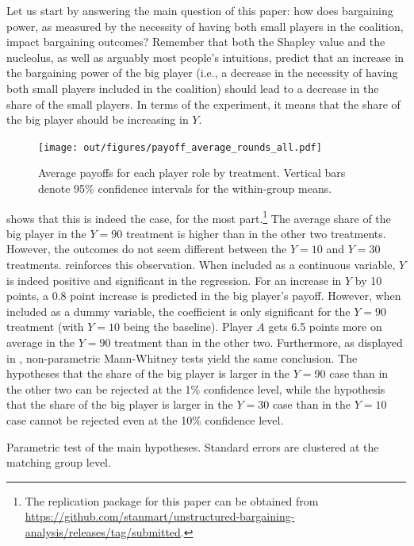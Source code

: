 \documentclass[12pt]{article}
\begin{document}
Let us start by answering the main question of this paper: how does bargaining power, as measured by the necessity of having both small players in the coalition, impact bargaining outcomes? Remember that both the Shapley value and the nucleolus, as well as arguably most people's intuitions, predict that an increase in the bargaining power of the big player (i.e., a decrease in the necessity of having both small players included in the coalition) should lead to a decrease in the share of the small players. In terms of the experiment, it means that the share of the big player should be increasing in $Y$.

\begin{figure}
    \centering
    \texttt{[image: out/figures/payoff\_average\_rounds\_all.pdf]}
    \caption{Average payoffs for each player role by treatment. Vertical bars denote 95\% confidence intervals for the within-group means.}
    \label{fig:main_means}
\end{figure}

 shows that this is indeed the case, for the most part.\footnote{The replication package for this paper can be obtained from  \\\href{https://github.com/stanmart/unstructured-bargaining-analysis/releases/tag/submitted}{https://github.com/stanmart/unstructured-bargaining-analysis/releases/tag/submitted}.} The average share of the big player in the $Y=90$ treatment is higher than in the other two treatments. However, the outcomes do not seem different between the $Y=10$ and $Y=30$ treatments.  reinforces this observation. When included as a continuous variable, $Y$ is indeed positive and significant in the regression. For an increase in $Y$ by 10 points, a 0.8 point increase is predicted in the big player's payoff. However, when included as a dummy variable, the coefficient is only significant for the $Y=90$ treatment (with $Y=10$ being the baseline). Player $A$ gets 6.5 points more on average in the $Y=90$ treatment than in the other two. Furthermore, as displayed in , non-parametric Mann-Whitney tests yield the same conclusion. The hypotheses that the share of the big player is larger in the $Y=90$ case than in the other two can be rejected at the 1\% confidence level, while the hypothesis that the share of the big player is larger in the $Y=30$ case than in the $Y=10$ case cannot be rejected even at the 10\% confidence level.

\begin{table}
    \centering
    
    \caption{Parametric test of the main hypotheses. Standard errors are clustered at the matching group level.}
    \label{tab:main_regressions}
\end{table}
\end{document}
